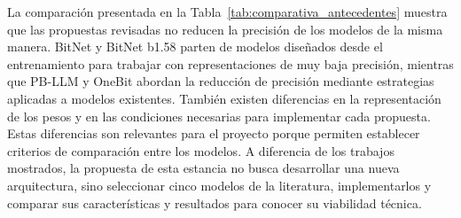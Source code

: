 La comparación presentada en la Tabla~\ref{tab:comparativa_antecedentes} muestra que las propuestas revisadas no reducen la precisión de los modelos de la misma manera. BitNet y BitNet b1.58 parten de modelos diseñados desde el entrenamiento para trabajar con representaciones de muy baja precisión, mientras que PB-LLM y OneBit abordan la reducción de precisión mediante estrategias aplicadas a modelos existentes. También existen diferencias en la representación de los pesos y en las condiciones necesarias para implementar cada propuesta. Estas diferencias son relevantes para el proyecto porque permiten establecer criterios de comparación entre los modelos. A diferencia de los trabajos mostrados, la propuesta de esta estancia no busca desarrollar una nueva arquitectura, sino seleccionar cinco modelos de la literatura, implementarlos y comparar sus características y resultados para conocer su viabilidad técnica.
